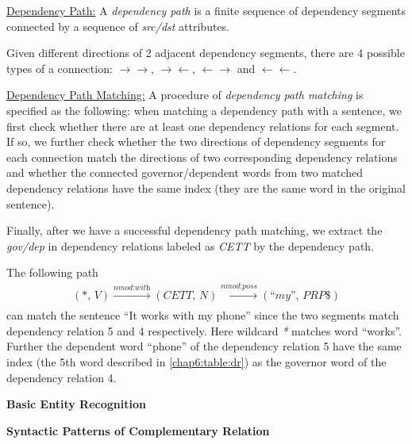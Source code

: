 \underline{Dependency Path:} \label{defn:path}
A \textit{dependency path} is a finite sequence of dependency segments connected by a sequence of \textit{src/dst} attributes.

Given different directions of 2 adjacent dependency segments, there are 4 possible types of a connection: $\rightarrow \rightarrow$, $\rightarrow \leftarrow$, $\leftarrow \rightarrow$ and $\leftarrow \leftarrow$.

\underline{Dependency Path Matching:} \label{defn:match2} 
A procedure of \emph{dependency path matching} is specified as the following: when matching a dependency path with a sentence, we first check whether there are at least one dependency relations for each segment. If so, we further check whether the two directions of dependency segments for each connection match the directions of two corresponding dependency relations and whether the connected governor/dependent words from two matched dependency relations have the same index (they are the same word in the original sentence).

Finally, after we have a successful dependency path matching, we extract the \textit{gov/dep} in dependency relations labeled as \textit{CETT} by the dependency path.

The following path
\begin{equation}
\label{eq:l2}
\begin{split}
(\textit{*, V})\xrightarrow[]{\textit{nmod:with}}(\textit{CETT, N})\xrightarrow[]{\textit{nmod:poss}}(\textit{``my'', PRP\$})
\end{split}
\end{equation}
can match the sentence ``It works with my phone'' since the two segments match dependency relation 5 and 4 respectively. Here wildcard \textit{*} matches word ``works''. Further the dependent word ``phone'' of the dependency relation 5 have the same index (the 5th word described in \ref{chap6:table:dr}) as the governor word of the dependency relation 4. 

\textbf{Basic Entity Recognition}
\label{sec:r}

\textbf{Syntactic Patterns of Complementary Relation}

